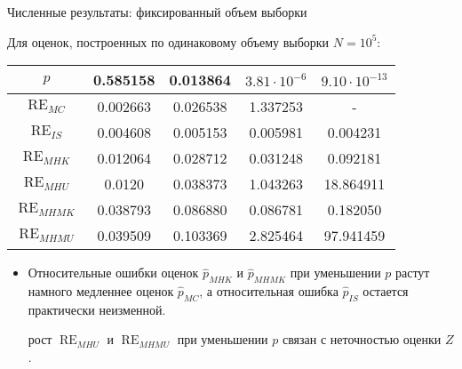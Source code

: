 \documentclass[pdf, 10pt, unicode]{beamer}
\DeclareMathOperator{\RE}{RE}
\begin{document}
\begin{frame}{Численные результаты: фиксированный объем выборки}
    
Для оценок, построенных по одинаковому объему выборки $N = 10^5$: 


\begin{table}[]
\begin{tabular}{@{}ccccc@{}}
\toprule
$p$         & 0.585158 & 0.013864 & $3.81\cdot 10^{-6}$ & $9.10\cdot 10^{-13}$ \\ \midrule
$\RE_{MC}$   & 0.002663 & 0.026538 & 1.337253            & -                    \\
$\RE_{IS}$   & 0.004608 & 0.005153 & 0.005981            & 0.004231             \\
$\RE_{MHK}$  & 0.012064 & 0.028712 & 0.031248            & 0.092181             \\
$\RE_{MHU}$  & 0.0120   & 0.038373 & 1.043263            & 18.864911            \\
$\RE_{MHMK}$ & 0.038793 & 0.086880 & 0.086781            & 0.182050             \\
$\RE_{MHMU}$ & 0.039509 & 0.103369 & 2.825464            & 97.941459            \\ \bottomrule
\end{tabular}
\end{table}

\begin{itemize}
\item Относительные ошибки оценок $\hat{p}_{MHK}$ и $\hat{p}_{MHMK}$ при уменьшении $p$ растут намного медленнее оценок $\hat{p}_{MC}$, а относительная ошибка $\hat{p}_{IS}$ остается практически неизменной. 

 рост $\RE_{MHU}$ и $\RE_{MHMU}$ при уменьшении $p$ связан с неточностью оценки $Z$.
\end{itemize}
\end{frame}
\end{document}
